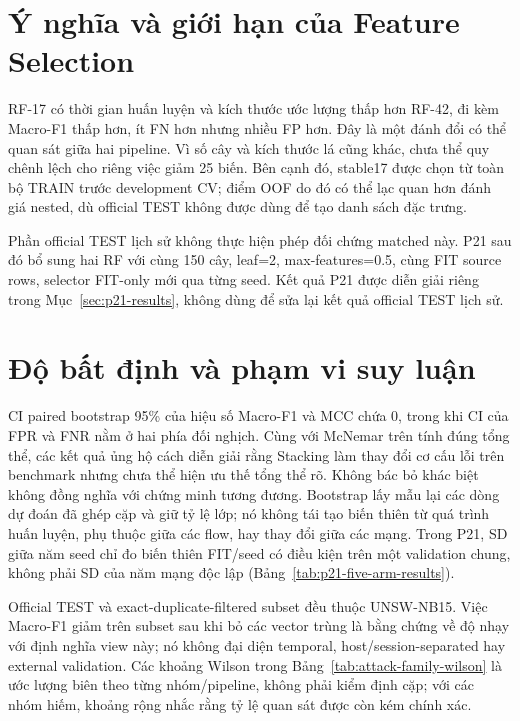\section{Ý nghĩa và giới hạn của Feature Selection}
\label{sec:discussion-feature-selection}

RF-17 có thời gian huấn luyện và kích thước ước lượng thấp hơn RF-42, đi kèm Macro-F1 thấp hơn, ít FN hơn nhưng nhiều FP hơn. Đây là một đánh đổi có thể quan sát giữa hai pipeline. Vì số cây và kích thước lá cũng khác, chưa thể quy chênh lệch cho riêng việc giảm 25 biến. Bên cạnh đó, stable17 được chọn từ toàn bộ TRAIN trước development CV; điểm OOF do đó có thể lạc quan hơn đánh giá nested, dù official TEST không được dùng để tạo danh sách đặc trưng.

Phần official TEST lịch sử không thực hiện phép đối chứng matched này. P21 sau đó bổ sung hai RF với cùng 150 cây, leaf=2, max-features=0.5, cùng FIT source rows, selector FIT-only mới qua từng seed. Kết quả P21 được diễn giải riêng trong Mục~\ref{sec:p21-results}, không dùng để sửa lại kết quả official TEST lịch sử.

\section{Độ bất định và phạm vi suy luận}
\label{sec:discussion-uncertainty}

CI paired bootstrap 95\% của hiệu số Macro-F1 và MCC chứa 0, trong khi CI của FPR và FNR nằm ở hai phía đối nghịch. Cùng với McNemar trên tính đúng tổng thể, các kết quả ủng hộ cách diễn giải rằng Stacking làm thay đổi cơ cấu lỗi trên benchmark nhưng chưa thể hiện ưu thế tổng thể rõ. Không bác bỏ khác biệt không đồng nghĩa với chứng minh tương đương. Bootstrap lấy mẫu lại các dòng dự đoán đã ghép cặp và giữ tỷ lệ lớp; nó không tái tạo biến thiên từ quá trình huấn luyện, phụ thuộc giữa các flow, hay thay đổi giữa các mạng. Trong P21, SD giữa năm seed chỉ đo biến thiên FIT/seed có điều kiện trên một validation chung, không phải SD của năm mạng độc lập (Bảng~\ref{tab:p21-five-arm-results}).

Official TEST và exact-duplicate-filtered subset đều thuộc UNSW-NB15. Việc Macro-F1 giảm trên subset sau khi bỏ các vector trùng là bằng chứng về độ nhạy với định nghĩa view này; nó không đại diện temporal, host/session-separated hay external validation. Các khoảng Wilson trong Bảng~\ref{tab:attack-family-wilson} là ước lượng biên theo từng nhóm/pipeline, không phải kiểm định cặp; với các nhóm hiếm, khoảng rộng nhắc rằng tỷ lệ quan sát được còn kém chính xác.

